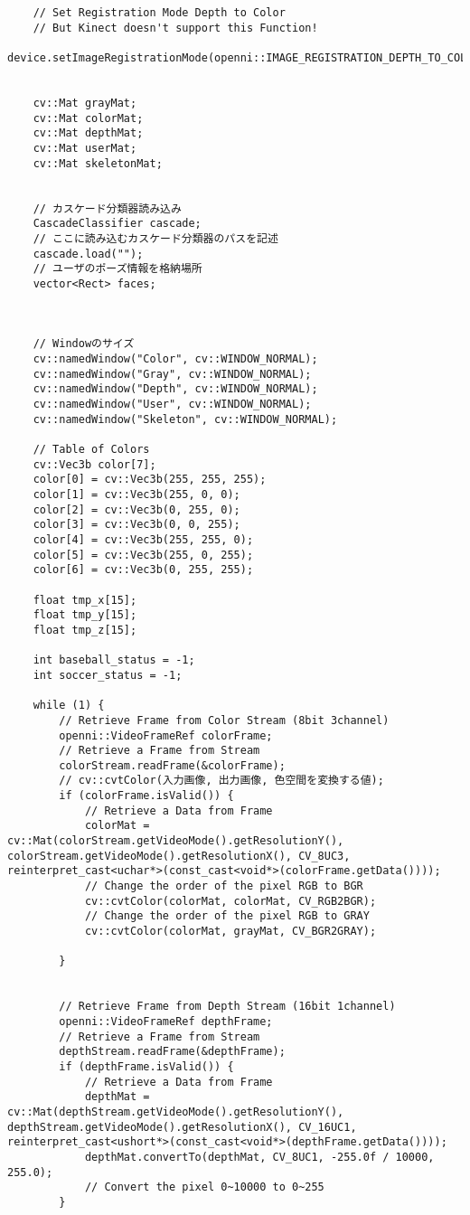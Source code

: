 \begin{lstlisting}
	// Set Registration Mode Depth to Color
	// But Kinect doesn't support this Function!
	device.setImageRegistrationMode(openni::IMAGE_REGISTRATION_DEPTH_TO_COLOR);


	cv::Mat grayMat;
	cv::Mat colorMat;
	cv::Mat depthMat;
	cv::Mat userMat;
	cv::Mat skeletonMat;


	// カスケード分類器読み込み
	CascadeClassifier cascade;
	// ここに読み込むカスケード分類器のパスを記述
	cascade.load("");
	// ユーザのポーズ情報を格納場所
	vector<Rect> faces;



	// Windowのサイズ
	cv::namedWindow("Color", cv::WINDOW_NORMAL);
	cv::namedWindow("Gray", cv::WINDOW_NORMAL);
	cv::namedWindow("Depth", cv::WINDOW_NORMAL);
	cv::namedWindow("User", cv::WINDOW_NORMAL);
	cv::namedWindow("Skeleton", cv::WINDOW_NORMAL);

	// Table of Colors
	cv::Vec3b color[7];
	color[0] = cv::Vec3b(255, 255, 255);
	color[1] = cv::Vec3b(255, 0, 0);
	color[2] = cv::Vec3b(0, 255, 0);
	color[3] = cv::Vec3b(0, 0, 255);
	color[4] = cv::Vec3b(255, 255, 0);
	color[5] = cv::Vec3b(255, 0, 255);
	color[6] = cv::Vec3b(0, 255, 255);

	float tmp_x[15];
	float tmp_y[15];
	float tmp_z[15];

	int baseball_status = -1;
	int soccer_status = -1;

	while (1) {
		// Retrieve Frame from Color Stream (8bit 3channel)
		openni::VideoFrameRef colorFrame;
		// Retrieve a Frame from Stream
		colorStream.readFrame(&colorFrame);
		// cv::cvtColor(入力画像, 出力画像, 色空間を変換する値);
		if (colorFrame.isValid()) {
			// Retrieve a Data from Frame 
			colorMat = cv::Mat(colorStream.getVideoMode().getResolutionY(), colorStream.getVideoMode().getResolutionX(), CV_8UC3, reinterpret_cast<uchar*>(const_cast<void*>(colorFrame.getData()))); 
			// Change the order of the pixel RGB to BGR 
			cv::cvtColor(colorMat, colorMat, CV_RGB2BGR); 
			// Change the order of the pixel RGB to GRAY
			cv::cvtColor(colorMat, grayMat, CV_BGR2GRAY); 

		}


		// Retrieve Frame from Depth Stream (16bit 1channel)
		openni::VideoFrameRef depthFrame;
		// Retrieve a Frame from Stream
		depthStream.readFrame(&depthFrame); 
		if (depthFrame.isValid()) {
			// Retrieve a Data from Frame
			depthMat = cv::Mat(depthStream.getVideoMode().getResolutionY(), depthStream.getVideoMode().getResolutionX(), CV_16UC1, reinterpret_cast<ushort*>(const_cast<void*>(depthFrame.getData()))); 
			depthMat.convertTo(depthMat, CV_8UC1, -255.0f / 10000, 255.0);
			// Convert the pixel 0~10000 to 0~255
		}


\end{lstlisting}
